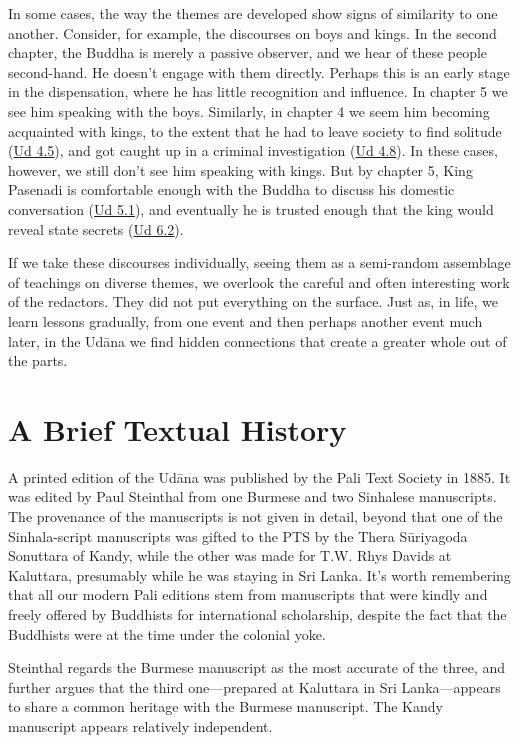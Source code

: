 \documentclass[12pt,openany]{book}%
\begin{document}
In some cases, the way the themes are developed show signs of similarity to one another. Consider, for example, the discourses on boys and kings. In the second chapter, the Buddha is merely a passive observer, and we hear of these people second-hand. He doesn’t engage with them directly. Perhaps this is an early stage in the dispensation, where he has little recognition and influence. In chapter 5 we see him speaking with the boys. Similarly, in chapter 4 we seem him becoming acquainted with kings, to the extent that he had to leave society to find solitude (\href{https://suttacentral.net/ud4.5/en/sujato}{Ud 4.5}), and got caught up in a criminal investigation (\href{https://suttacentral.net/ud4.8/en/sujato}{Ud 4.8}). In these cases, however, we still don’t see him speaking with kings. But by chapter 5, King Pasenadi is comfortable enough with the Buddha to discuss his domestic conversation (\href{https://suttacentral.net/ud5.1/en/sujato}{Ud 5.1}), and eventually he is trusted enough that the king would reveal state secrets (\href{https://suttacentral.net/ud6.2/en/sujato}{Ud 6.2}). 

If we take these discourses individually, seeing them as a semi-random assemblage of teachings on diverse themes, we overlook the careful and often interesting work of the redactors. They did not put everything on the surface. Just as, in life, we learn lessons gradually, from one event and then perhaps another event much later, in the \textsanskrit{Udāna} we find hidden connections that create a greater whole out of the parts.

\section*{A Brief Textual History}

A printed edition of the \textsanskrit{Udāna} was published by the Pali Text Society in 1885. It was edited by Paul Steinthal from one Burmese and two Sinhalese manuscripts. The provenance of the manuscripts is not given in detail, beyond that one of the Sinhala-script manuscripts was gifted to the PTS by the Thera \textsanskrit{Sūriyagoda} Sonuttara of Kandy, while the other was made for T.W. Rhys Davids at Kaluttara, presumably while he was staying in Sri Lanka. It’s worth remembering that all our modern Pali editions stem from manuscripts that were kindly and freely offered by Buddhists for international scholarship, despite the fact that the Buddhists were at the time under the colonial yoke. 

Steinthal regards the Burmese manuscript as the most accurate of the three, and further argues that the third one—prepared at Kaluttara in Sri Lanka—appears to share a common heritage with the Burmese manuscript. The Kandy manuscript appears relatively independent.
\end{document}
